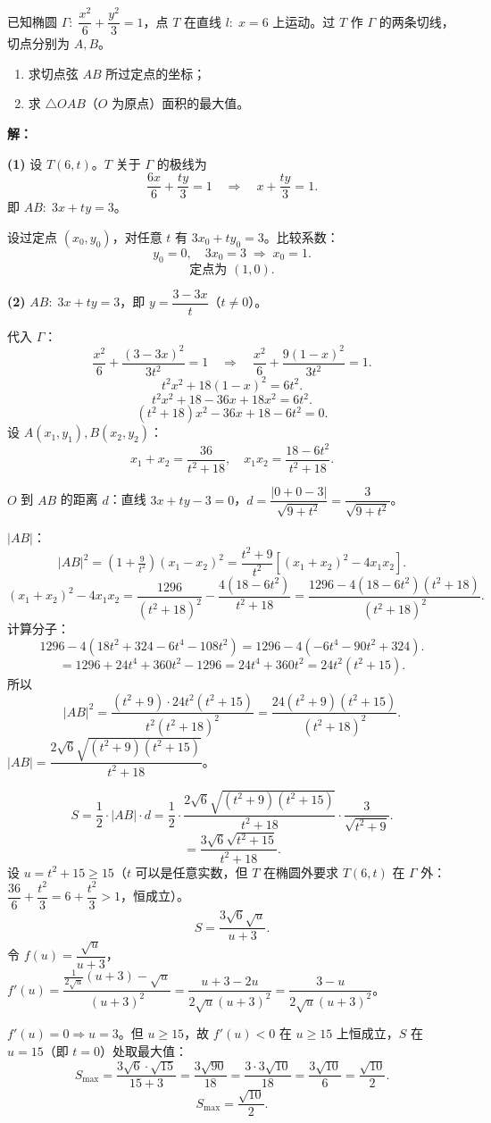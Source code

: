 \documentclass[12pt,a4paper]{ctexart}
\theoremstyle{definition}
\begin{document}
\begin{appbox}
已知椭圆 $\Gamma:\;\dfrac{x^2}{6}+\dfrac{y^2}{3}=1$，点 $T$ 在直线 $l:\;x=6$ 上运动。过 $T$ 作 $\Gamma$ 的两条切线，切点分别为 $A,B$。
\begin{enumerate}[label=(\arabic*)]
  \item 求切点弦 $AB$ 所过定点的坐标；
  \item 求 $\triangle OAB$（$O$ 为原点）面积的最大值。
\end{enumerate}
\end{appbox}

\begin{solutionbox}
\textbf{解：}

\textbf{(1)} 设 $T(6,t)$。$T$ 关于 $\Gamma$ 的极线为
\[
  \frac{6x}{6}+\frac{ty}{3}=1 \quad\Longrightarrow\quad x+\frac{ty}{3}=1.
\]
即 $AB:\;3x+ty=3$。

设过定点 $(x_0,y_0)$，对任意 $t$ 有 $3x_0+ty_0=3$。比较系数：
\[
  y_0=0,\quad 3x_0=3\;\Rightarrow\; x_0=1.
\]
\[
  \boxed{\text{定点为 }(1,0).}
\]

\textbf{(2)} $AB:\;3x+ty=3$，即 $y=\dfrac{3-3x}{t}$（$t\neq0$）。

代入 $\Gamma$：
\[
  \frac{x^2}{6}+\frac{(3-3x)^2}{3t^2}=1 \quad\Longrightarrow\quad \frac{x^2}{6}+\frac{9(1-x)^2}{3t^2}=1.
\]
\[
  t^2 x^2+18(1-x)^2=6t^2.
\]
\[
  t^2 x^2+18-36x+18x^2=6t^2.
\]
\[
  (t^2+18)x^2-36x+18-6t^2=0.
\]
设 $A(x_1,y_1),B(x_2,y_2)$：
\[
  x_1+x_2=\frac{36}{t^2+18},\quad x_1 x_2=\frac{18-6t^2}{t^2+18}.
\]

$O$ 到 $AB$ 的距离 $d$：直线 $3x+ty-3=0$，$d=\dfrac{|0+0-3|}{\sqrt{9+t^2}}=\dfrac{3}{\sqrt{9+t^2}}$。

$|AB|$：
\[
  |AB|^2=(1+\tfrac{9}{t^2})(x_1-x_2)^2=\frac{t^2+9}{t^2}\left[(x_1+x_2)^2-4x_1x_2\right].
\]
\[
  (x_1+x_2)^2-4x_1x_2=\frac{1296}{(t^2+18)^2}-\frac{4(18-6t^2)}{t^2+18}=\frac{1296-4(18-6t^2)(t^2+18)}{(t^2+18)^2}.
\]
计算分子：
\[
  1296-4(18t^2+324-6t^4-108t^2)=1296-4(-6t^4-90t^2+324).
\]
\[
  =1296+24t^4+360t^2-1296=24t^4+360t^2=24t^2(t^2+15).
\]
所以
\[
  |AB|^2=\frac{(t^2+9)\cdot 24t^2(t^2+15)}{t^2(t^2+18)^2}=\frac{24(t^2+9)(t^2+15)}{(t^2+18)^2}.
\]
$|AB|=\dfrac{2\sqrt{6}\sqrt{(t^2+9)(t^2+15)}}{t^2+18}$。

\[
  S=\frac{1}{2}\cdot|AB|\cdot d=\frac{1}{2}\cdot\frac{2\sqrt{6}\sqrt{(t^2+9)(t^2+15)}}{t^2+18}\cdot\frac{3}{\sqrt{t^2+9}}.
\]
\[
  =\frac{3\sqrt{6}\sqrt{t^2+15}}{t^2+18}.
\]
设 $u=t^2+15\geq15$（$t$ 可以是任意实数，但 $T$ 在椭圆外要求 $T(6,t)$ 在 $\Gamma$ 外：$\dfrac{36}{6}+\dfrac{t^2}{3}=6+\dfrac{t^2}{3}>1$，恒成立）。
\[
  S=\frac{3\sqrt{6}\sqrt{u}}{u+3}.
\]
令 $f(u)=\dfrac{\sqrt{u}}{u+3}$，$f'(u)=\dfrac{\frac{1}{2\sqrt{u}}(u+3)-\sqrt{u}}{(u+3)^2}=\dfrac{u+3-2u}{2\sqrt{u}(u+3)^2}=\dfrac{3-u}{2\sqrt{u}(u+3)^2}$。

$f'(u)=0 \Rightarrow u=3$。但 $u\geq15$，故 $f'(u)<0$ 在 $u\geq15$ 上恒成立，$S$ 在 $u=15$（即 $t=0$）处取最大值：
\[
  S_{\max}=\frac{3\sqrt{6}\cdot\sqrt{15}}{15+3}=\frac{3\sqrt{90}}{18}=\frac{3\cdot3\sqrt{10}}{18}=\frac{3\sqrt{10}}{6}=\frac{\sqrt{10}}{2}.
\]
\[
  \boxed{S_{\max}=\frac{\sqrt{10}}{2}.}
\]
\end{solutionbox}
\end{document}
